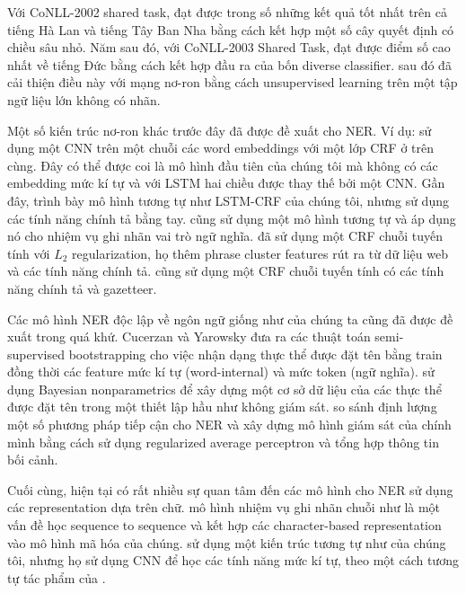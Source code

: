 \documentclass[11pt,letterpaper]{article}
\begin{document}
Với CoNLL-2002 shared task,  đạt được trong số những kết quả tốt nhất trên cả tiếng Hà Lan và tiếng Tây Ban Nha bằng cách kết hợp một số cây quyết định có chiều sâu nhỏ. Năm sau đó, với CoNLL-2003 Shared Task,  đạt được điểm số cao nhất về tiếng Đức bằng cách kết hợp đầu ra của bốn diverse classifier.  sau đó đã cải thiện điều này với mạng nơ-ron bằng cách unsupervised learning trên một tập ngữ liệu lớn không có nhãn.

Một số kiến trúc nơ-ron khác trước đây đã được đề xuất cho NER. Ví dụ:  sử dụng một CNN trên một chuỗi các word embeddings với một lớp CRF ở trên cùng. Đây có thể được coi là mô hình đầu tiên của chúng tôi mà không có các embedding mức kí tự và với LSTM hai chiều được thay thế bởi một CNN. Gần đây,  trình bày mô hình tương tự như LSTM-CRF của chúng tôi, nhưng sử dụng các tính năng chính tả bằng tay.  cũng sử dụng một mô hình tương tự và áp dụng nó cho nhiệm vụ ghi nhãn vai trò ngữ nghĩa.  đã sử dụng một CRF chuỗi tuyến tính với $L_2$ regularization, họ thêm phrase cluster features rút ra từ dữ liệu web và các tính năng chính tả. cũng sử dụng một CRF chuỗi tuyến tính có các tính năng chính tả và gazetteer.

Các mô hình NER độc lập về ngôn ngữ giống như của chúng ta cũng đã được đề xuất trong quá khứ. Cucerzan và Yarowsky  đưa ra các thuật toán semi-supervised bootstrapping cho việc nhận dạng thực thể được đặt tên bằng train đồng thời các feature mức kí tự (word-internal) và mức token (ngữ nghĩa).  sử dụng Bayesian nonparametrics để xây dựng một cơ sở dữ liệu của các thực thể được đặt tên trong một thiết lập hầu như không giám sát.  so sánh định lượng một số phương pháp tiếp cận cho NER và xây dựng mô hình giám sát của chính mình bằng cách sử dụng regularized average perceptron và tổng hợp thông tin bối cảnh.

Cuối cùng, hiện tại có rất nhiều sự quan tâm đến các mô hình cho NER sử dụng các representation dựa trên chữ.  mô hình nhiệm vụ ghi nhãn chuỗi như là một vấn đề học sequence to sequence và kết hợp các  character-based representation vào mô hình mã hóa của chúng.  sử dụng một kiến trúc tương tự như của chúng tôi, nhưng họ sử dụng CNN để học các tính năng mức kí tự, theo một cách tương tự tác phẩm của .
\end{document}
